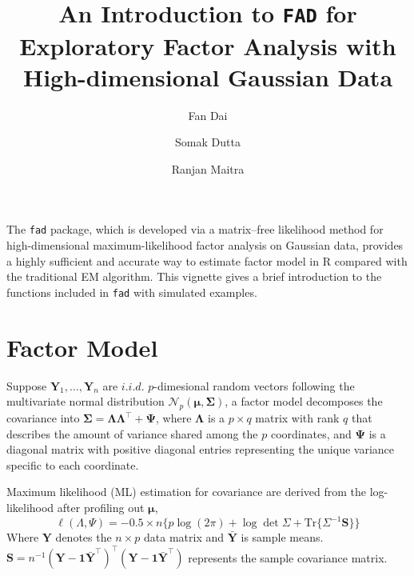 \documentclass{article}
\begin{document}




\title{An Introduction to \texttt{FAD} for Exploratory Factor Analysis with High-dimensional Gaussian Data}

\author{Fan Dai}
\author{Somak Dutta}
\author{Ranjan Maitra}

\maketitle

The \texttt{fad} package, which is developed via a matrix--free likelihood method for high-dimensional maximum-likelihood factor analysis on Gaussian data, provides a highly sufficient and accurate way to estimate factor model in R compared with the traditional EM algorithm. This vignette gives a brief introduction to the functions included in \texttt{fad} with simulated examples.

\section{Factor Model}
\label{sec:factor}
Suppose $\mathbf{Y}_1,\ldots,\mathbf{Y}_n$ are $i.i.d.$ $p$-dimesional random vectors following the multivariate normal distribution $\mathcal{N}_p(\bm{\mu}, \bm{\Sigma})$, a factor model decomposes the covariance into $\bm{\Sigma} = \bm{\Lambda}\bm{\Lambda}^{\top} + \bm{\Psi}$, where $\bm{\Lambda}$ is a $p\times q$ matrix with rank $q$ that describes the amount of variance shared among the $p$ coordinates, and $\bm{\Psi}$ is a diagonal matrix with positive diagonal entries representing the unique variance specific to each coordinate.

Maximum likelihood (ML) estimation for covariance are derived from the log-likelihood after profiling out $\bm\mu$,
\begin{equation}\label{eqn:loglikelihood}
\ell(\Lambda,\Psi) = -0.5\times n\{p\log(2\pi) + \log\det\Sigma +\mathrm{Tr}\{\Sigma^{-1}\mathbf{S}\}\}
\end{equation}
Where $\mathbf{Y}$ denotes the $n\times p$ data matrix and $\bar{\mathbf{Y}}$ is sample means. $\mathbf{S} = n^{-1}(\mathbf{Y} - \mathbf{1}\bar{\mathbf{Y}}^\top)^\top(\mathbf{Y} - \mathbf{1}\bar{\mathbf{Y}}^\top)$ represents the sample covariance matrix.
\end{document}
